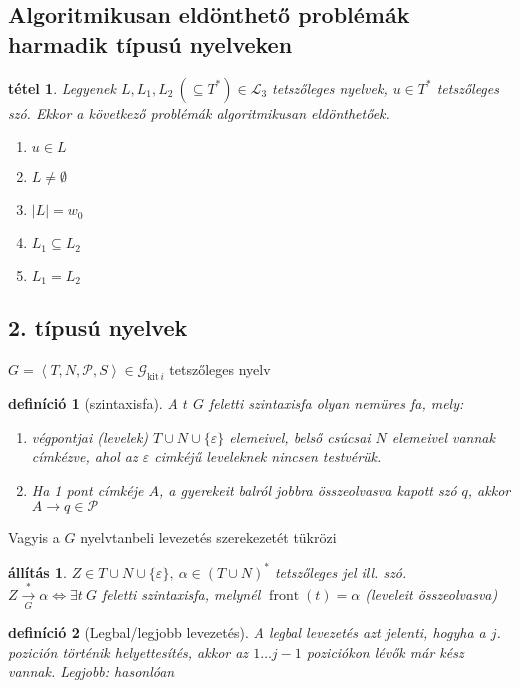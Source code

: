 \documentclass[fleqn,10pt,a4paper]{article}
\renewcommand{\epsilon}{\varepsilon}
\newcommand{\listazjbetu}{
  \renewcommand{\theenumi}{\alph{enumi}}
  \renewcommand{\labelenumi}{(\theenumi)}
}
\newenvironment{enumzjbetu}{\listazjbetu\begin{enumerate}}{\end{enumerate}}
\newenvironment{enumzjb}{\begin{enumzjbetu}}{\end{enumzjbetu}}
\theoremstyle{magyar}
\newtheorem{de}{definíció}[section]
\newtheorem{te}{tétel}[section]
\newtheorem{al}{állítás}[section]
\DeclareMathOperator{\front}{front}
\newcommand{\Lang}{\mathcal{L}}
\newcommand{\Nytan}{\mathcal{G}}
\newcommand{\szabalyok}{\mathcal{P}}
\begin{document}
  
  \subsection{Algoritmikusan eldönthető problémák harmadik típusú nyelveken}
  \begin{te} Legyenek $L,L_1,L_2\ (\subseteq T^*)\in \Lang_3$ tetszőleges nyelvek, $u\in T^*$ tetszőleges szó. Ekkor a
    következő problémák algoritmikusan eldönthetőek.
    \begin{enumerate}
    \item $u\in L$
    \item  $L\neq \emptyset$
    \item $|L| = w_0$
    \item  $L_1\subseteq L_2$
    \item $L_1=L_2$
    \end{enumerate}
  \end{te}
  
  \subsection{2. típusú nyelvek}
  $G= \left< T, N, \szabalyok, S \right>\in \Nytan_{\text{kit}\,i}$ tetszőleges nyelv
  \begin{de}[szintaxisfa] A $t$  $G$ feletti szintaxisfa olyan nemüres fa, mely:
    \begin{enumzjb}
    \item végpontjai (levelek) $T\cup N \cup \{\epsilon\}$ elemeivel, belső csúcsai $N$ elemeivel vannak címkézve, ahol
      az $\epsilon$ cimkéjű leveleknek nincsen testvérük.
    \item Ha 1 pont címkéje $A$, a gyerekeit balról jobbra összeolvasva kapott szó $q$, akkor\\ $A\to q \in \szabalyok$
    \end{enumzjb}
  \end{de}
  Vagyis a $G$ nyelvtanbeli levezetés szerekezetét tükrözi
  
  \begin{al}
    $Z\in T\cup N\cup \{\epsilon\},\ \alpha\in (T\cup N)^*$ tetszőleges jel ill. szó.\\
    $Z\xrightarrow[G]{*}\alpha\iff \exists t\ G$ feletti szintaxisfa, melynél $\front(t) = \alpha$ (leveleit összeolvasva)
  \end{al}

  \begin{de}[Legbal/legjobb levezetés] A legbal levezetés azt jelenti, hogyha a $j$. pozición történik helyettesítés,
    akkor az $1\ldots j-1$ poziciókon lévők már kész vannak. Legjobb: hasonlóan
  \end{de}
\end{document}
